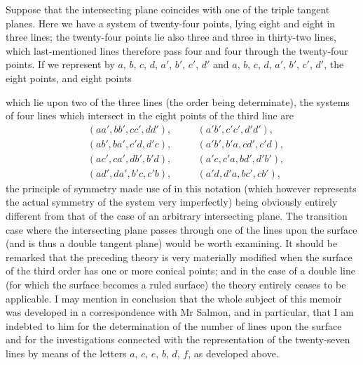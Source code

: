 \documentclass[11pt,a4paper]{book}
\begin{document}
\newpage

\setcounter{page}{455}

Suppose that the intersecting plane coincides with one of the triple tangent planes. Here we have a system of twenty-four points, lying eight and eight in three lines; the twenty-four points lie also three and three in thirty-two lines, which last-mentioned lines therefore pass four and four through the twenty-four points. If we represent by $a$, $b$, $c$, $d$, $a'$, $b'$, $c'$, $d'$ and $a$, $b$, $c$, $d$, $a'$, $b'$, $c'$, $d'$, the eight points, and eight points

\newpage

\setcounter{page}{456}

which lie upon two of the three lines (the order being determinate), the systems of four lines which intersect in the eight points of the third line are
\begin{align*}
&(aa', bb', cc', dd'), \quad &&(a'b', c'c', d'd'), \\
&(ab', ba', c'd, d'c), \quad &&(a'b', b'a, cd', c'd), \\
&(ac', ca', db', b'd), \quad &&(a'c, c'a, bd', d'b'), \\
&(ad', da', b'c, c'b), \quad &&(a'd, d'a, bc', cb'),
\end{align*}
the principle of symmetry made use of in this notation (which however represents the actual symmetry of the system very imperfectly) being obviously entirely different from that of the case of an arbitrary intersecting plane. The transition case where the intersecting plane passes through one of the lines upon the surface (and is thus a double tangent plane) would be worth examining. It should be remarked that the preceding theory is very materially modified when the surface of the third order has one or more conical points; and in the case of a double line (for which the surface becomes a ruled surface) the theory entirely ceases to be applicable. I may mention in conclusion that the whole subject of this memoir was developed in a correspondence with Mr Salmon, and in particular, that I am indebted to him for the determination of the number of lines upon the surface and for the investigations connected with the representation of the twenty-seven lines by means of the letters $a$, $c$, $e$, $b$, $d$, $f$, as developed above.



\newpage
\end{document}
